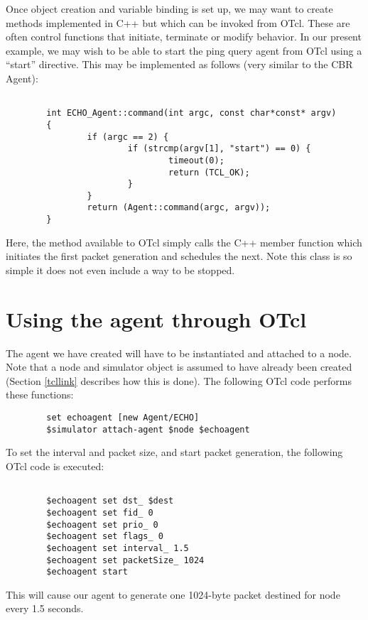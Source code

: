 Once object creation and variable binding is set up, we may
want to create methods implemented in C++ but which can
be invoked from OTcl.
These are often control functions that initiate, terminate or
modify behavior.
In our present example, we may wish to be able to start the
ping query agent from OTcl using a ``start'' directive.
This may be implemented as follows (very similar to the CBR Agent):
\begin{small}
\begin{verbatim}

        int ECHO_Agent::command(int argc, const char*const* argv)
        {
                if (argc == 2) {
                        if (strcmp(argv[1], "start") == 0) {
                                timeout(0);
                                return (TCL_OK);
                        }
                }
                return (Agent::command(argc, argv));
        }
\end{verbatim}
\end{small}
Here, the  method available to OTcl simply calls
the C++ member function  which initiates the
first packet generation and schedules the next.
Note this class is so simple it does not even include a
way to be stopped.

\section{Using the agent through OTcl}

The agent we have created will have to be instantiated and attached
to a node.
Note that a node and simulator object is assumed to have
already been
created (Section \ref{tcllink} describes how this is done).
The following OTcl code performs these functions:
\begin{small}
\begin{verbatim}
        set echoagent [new Agent/ECHO]
        $simulator attach-agent $node $echoagent
\end{verbatim}
\end{small}

To set the interval and packet size, and start packet generation,
the following OTcl code is executed:
\begin{small}
\begin{verbatim}

        $echoagent set dst_ $dest
        $echoagent set fid_ 0
        $echoagent set prio_ 0
        $echoagent set flags_ 0
        $echoagent set interval_ 1.5
        $echoagent set packetSize_ 1024
        $echoagent start
\end{verbatim}
\end{small}

This will cause our agent to generate one 1024-byte packet destined for
node  every 1.5 seconds.

\endinput
